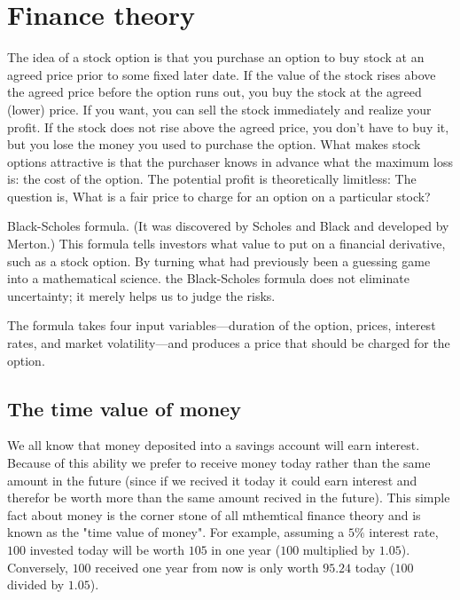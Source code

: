 \chapter{Finance theory}

The idea of a stock option is that you purchase an option to buy stock at an agreed price prior to some fixed later date. If the value of the stock rises above the agreed price before the option runs out, you buy the stock at the agreed (lower) price. If you want, you can sell the stock immediately and realize your profit. If the stock does not rise above the agreed price, you don’t have to buy it, but you lose the money you used to purchase the option. What makes stock options attractive is that the purchaser knows in advance what the maximum loss is: the cost of the option. The potential profit is theoretically limitless: The question is, What is a fair price to charge for an option on a particular stock?

Black-Scholes formula. (It was discovered by Scholes and Black and developed by Merton.) This formula tells investors what value to put on a financial derivative, such as a stock option. By turning what had previously been a guessing game into a mathematical science. the Black-Scholes formula does not eliminate uncertainty; it merely helps us to judge the risks.

The formula takes four input variables—duration of the option, prices, interest rates, and market volatility—and produces a price that should be charged for the option.


\section{The time value of money}
We all know that money deposited into a savings account will earn interest.
Because of this ability we prefer to receive money today rather than the same
amount in the future (since if we recived it today it could earn interest and therefor be worth more than the same amount recived in the future). This simple
fact about money is the corner stone of all mthemtical finance theory and is
known as the "time value of money". For example, assuming a $5\%$ interest rate,
$100$ invested today will be worth $105$ in one year ($100$ multiplied by $1.05$).
Conversely, $100$ received one year from now is only worth $95.24$ today ($100$
divided by $1.05$).

